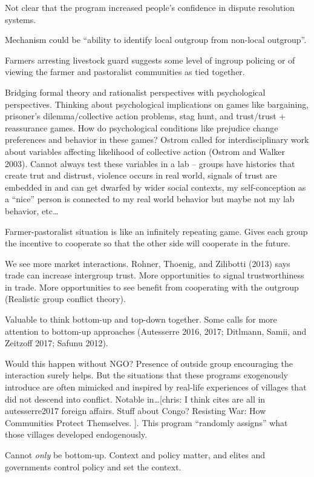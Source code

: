 \documentclass[11pt]{article}
\begin{document}
Not clear that the program increased people's confidence in dispute
resolution systems.

Mechanism could be ``ability to identify local outgroup from non-local
outgroup''.

Farmers arresting livestock guard suggests some level of ingroup
policing or of viewing the farmer and pastoralist communities as tied
together.

Bridging formal theory and rationalist perspectives with psychological
perspectives. Thinking about psychological implications on games like
bargaining, prisoner's dilemma/collective action problems, stag hunt,
and trust/trust + reassurance games. How do psychological conditions
like prejudice change preferences and behavior in these games? Ostrom
called for interdisciplinary work about variables affecting likelihood
of collective action (Ostrom and Walker 2003). Cannot always test these
variables in a lab -- groups have histories that create trut and
distrust, violence occurs in real world, signals of trust are embedded
in and can get dwarfed by wider social contexts, my self-conception as a
``nice'' person is connected to my real world behavior but maybe not my
lab behavior, etc\ldots{}

Farmer-pastoralist situation is like an infinitely repeating game. Gives
each group the incentive to cooperate so that the other side will
cooperate in the future.

We see more market interactions. Rohner, Thoenig, and Zilibotti (2013)
says trade can increase intergroup trust. More opportunities to signal
trustworthiness in trade. More opportunities to see benefit from
cooperating with the outgroup (Realistic group conflict theory).

Valuable to think bottom-up and top-down together. Some calls for more
attention to bottom-up approaches (Autesserre 2016, 2017; Ditlmann,
Samii, and Zeitzoff 2017; Safunu 2012).

Would this happen without NGO? Presence of outside group encouraging the
interaction surely helps. But the situations that these programs
exogenously introduce are often mimicked and inspired by real-life
experiences of villages that did not descend into conflict. Notable
in\ldots{}{[}chris: I think cites are all in autesserre2017 foreign
affairs. Stuff about Congo? Resisting War: How Communities Protect
Themselves. {]}. This program ``randomly assigns'' what those villages
developed endogenously.

Cannot \emph{only} be bottom-up. Context and policy matter, and elites
and governments control policy and set the context.
\end{document}
